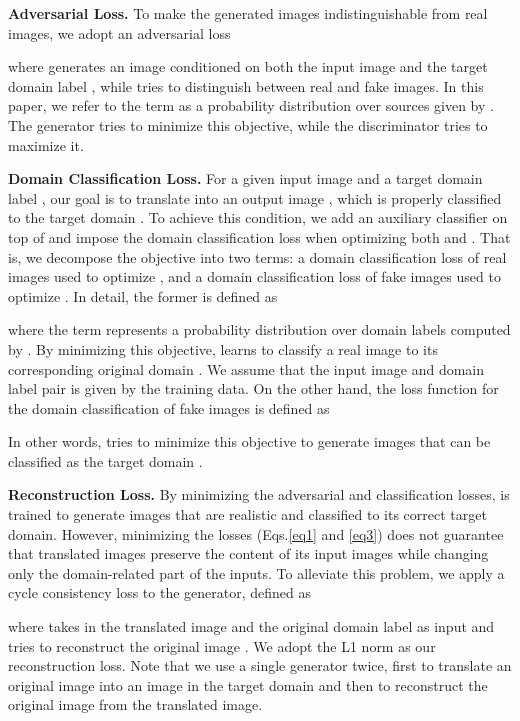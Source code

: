 \documentclass[10pt,twocolumn,letterpaper]{article}
\begin{document}
\medskip

\noindent \textbf{Adversarial Loss.} To make the generated images indistinguishable from real images, we adopt an adversarial loss

\noindent where  generates an image  conditioned on both the input image  and the target domain label , while  tries to distinguish between real and fake images. In this paper, we refer to the term  as a probability distribution over sources given by . The generator  tries to minimize this objective, while the discriminator  tries to maximize it.

\medskip

\noindent \textbf{Domain Classification Loss.} For a given input image  and a target domain label , our goal is to translate  into an output image , which is properly classified to the target domain . To achieve this condition, we add an auxiliary classifier on top of  and impose the domain classification loss when optimizing both  and . That is, we decompose the objective into two terms: a domain classification loss of real images used to optimize , and a domain classification loss of fake images used to optimize . In detail, the former is defined as

where the term  represents a probability distribution over domain labels computed by . By minimizing this objective,  learns to classify a real image  to its corresponding original domain . We assume that the input image and domain label pair  is given by the training data. On the other hand, the loss function for the domain classification of fake images is defined as

In other words,  tries to minimize this objective to generate images that can be classified as the target domain . 

\medskip

\noindent \textbf{Reconstruction Loss.} By minimizing the adversarial and classification losses,  is trained to generate images that are realistic and classified to its correct target domain. However, minimizing the losses (Eqs.\thinspace\eqref{eq1} and \eqref{eq3}) does not guarantee that translated images preserve the content of its input images while changing only the domain-related part of the inputs. To alleviate this problem, we apply a cycle consistency loss \cite{kim2017learning, zhu2017unpaired} to the generator, defined as 

\noindent where  takes in the translated image  and the original domain label  as input and tries to reconstruct the original image . We adopt the L1 norm as our reconstruction loss. Note that we use a single generator twice, first to translate an original image into an image in the target domain and then to reconstruct the original image from the translated image. 
\end{document}
